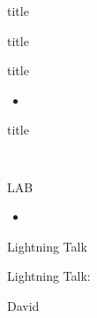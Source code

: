 
\begin{frame}{title}

\end{frame}

\begin{frame}{title}

{\Large   }
\end{frame}

\begin{frame}{title}

\begin{itemize}
  \item
\end{itemize}

\end{frame}

\begin{frame}[fragile]{title}

{\Large }
\begin{verbatim}
  
\end{verbatim}

\end{frame}

\begin{frame}{LAB}

\begin{itemize}
  \item
\end{itemize}

\end{frame}

\begin{frame}{Lightning Talk}

{\centering

\vfill
{\LARGE Lightning Talk:  }

\vfill
{\Huge David}

\vfill
}
\end{frame}

